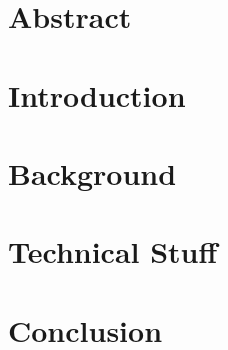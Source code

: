 \documentclass[a4paper,12pt,titlepage,]{scrreprt}
\begin{document}


\section{Abstract}

\section{Introduction}

\section{Background}


\section{Technical Stuff}

\section{Conclusion}


\end{document}
